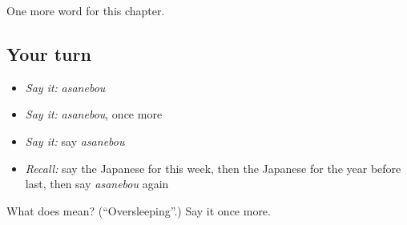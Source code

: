 \begin{grammarlens}[title={What you've built}]
One more word for this chapter.
\end{grammarlens}

\subsection*{Your turn}
\begin{itemize}
\raggedright
  \item \emph{Say it:} \emph{asanebou}
  \item \emph{Say it:} \emph{asanebou}, once more
  \item \emph{Say it:} say \emph{asanebou}
  \item \emph{Recall:} say the Japanese for this week, then the Japanese for the year before last, then say \emph{asanebou} again
\end{itemize}

\begin{tcolorbox}[breakable,colback=teal!4,colframe=teal!35!black,title={Before you move on}]
What does  mean? (\textquotedblleft{}Oversleeping\textquotedblright{}.) Say it once more.
\end{tcolorbox}
